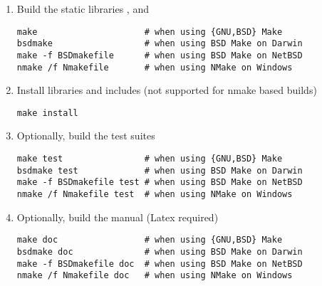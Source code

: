 \begin{enumerate}
\item Build the static libraries ,  and 
\begin{lstlisting}
make                     # when using {GNU,BSD} Make
bsdmake                  # when using BSD Make on Darwin
make -f BSDmakefile      # when using BSD Make on NetBSD
nmake /f Nmakefile       # when using NMake on Windows
\end{lstlisting}
\item Install libraries and includes (not supported for nmake based builds)
\begin{lstlisting}
make install 
\end{lstlisting}
\item Optionally, build the test suites
\begin{lstlisting}
make test                # when using {GNU,BSD} Make
bsdmake test             # when using BSD Make on Darwin
make -f BSDmakefile test # when using BSD Make on NetBSD
nmake /f Nmakefile test  # when using NMake on Windows
\end{lstlisting}
\item Optionally, build the manual (Latex required)
\begin{lstlisting}
make doc                 # when using {GNU,BSD} Make
bsdmake doc              # when using BSD Make on Darwin
make -f BSDmakefile doc  # when using BSD Make on NetBSD
nmake /f Nmakefile doc   # when using NMake on Windows
\end{lstlisting}
\end{enumerate}

